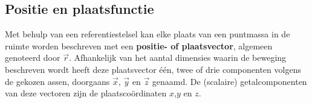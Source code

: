 \documentclass{ximera}
\begin{document}
	\author{Bart Lambregs, Vincent Gellens}
    \xmsource\xmuitleg




\subsection*{Positie en plaatsfunctie}

Met behulp van een referentiestelsel kan elke plaats van een puntmassa in de ruimte worden beschreven met een \textbf{positie- of plaatsvector}, algemeen genoteerd door $\vec{r}$.
Afhankelijk van het aantal dimensies waarin de beweging beschreven wordt heeft deze plaatsvector één, twee of drie componenten volgens de gekozen assen, doorgaans \(\vec{x}\), \(\vec{y}\) en \(\vec{z}\) genaamd.
De (scalaire) getalcomponenten van deze vectoren zijn de plaatscoördinaten \(x\),\(y\) en \(z\).
\end{document}
